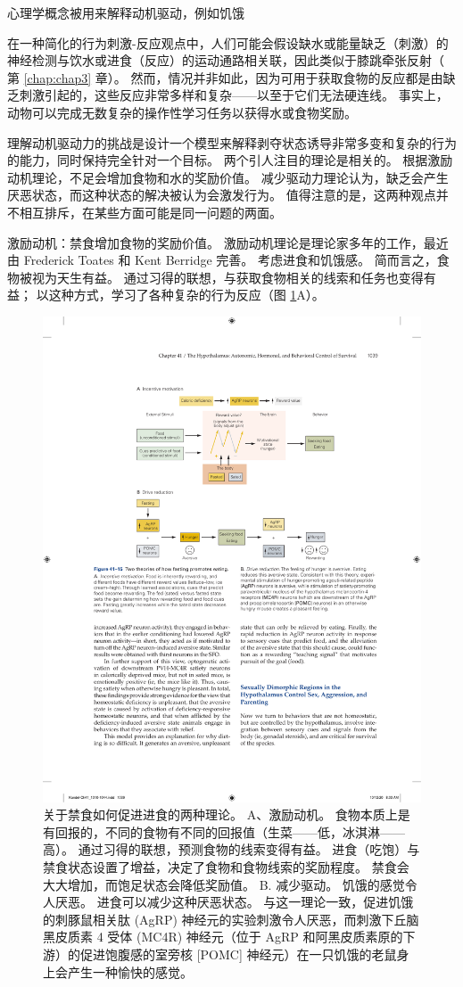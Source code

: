心理学概念被用来解释动机驱动，例如饥饿

在一种简化的行为刺激-反应观点中，人们可能会假设缺水或能量缺乏（刺激）的神经检测与饮水或进食（反应）的运动通路相关联，因此类似于膝跳牵张反射（ 第 \ref{chap:chap3} 章）。 然而，情况并非如此，因为可用于获取食物的反应都是由缺乏刺激引起的，这些反应非常多样和复杂——以至于它们无法硬连线。 事实上，动物可以完成无数复杂的操作性学习任务以获得水或食物奖励。

理解动机驱动力的挑战是设计一个模型来解释剥夺状态诱导非常多变和复杂的行为的能力，同时保持完全针对一个目标。 两个引人注目的理论是相关的。 根据激励动机理论，不足会增加食物和水的奖励价值。 减少驱动力理论认为，缺乏会产生厌恶状态，而这种状态的解决被认为会激发行为。 值得注意的是，这两种观点并不相互排斥，在某些方面可能是同一问题的两面。

激励动机：禁食增加食物的奖励价值。 激励动机理论是理论家多年的工作，最近由 Frederick Toates 和 Kent Berridge 完善。 考虑进食和饥饿感。 简而言之，食物被视为天生有益。 
通过习得的联想，与获取食物相关的线索和任务也变得有益； 以这种方式，学习了各种复杂的行为反应（图 \ref{fig:41_15}A）。

\begin{figure}[htbp]
	\centering
	\includegraphics[width=0.75\linewidth]{chap41/fig_41_15}
	\caption{关于禁食如何促进进食的两种理论。 
		A、激励动机。 食物本质上是有回报的，不同的食物有不同的回报值（生菜——低，冰淇淋——高）。 通过习得的联想，预测食物的线索变得有益。 进食（吃饱）与禁食状态设置了增益，决定了食物和食物线索的奖励程度。 禁食会大大增加，而饱足状态会降低奖励值。 B. 减少驱动。 饥饿的感觉令人厌恶。 进食可以减少这种厌恶状态。 与这一理论一致，促进饥饿的刺豚鼠相关肽 (AgRP) 神经元的实验刺激令人厌恶，而刺激下丘脑黑皮质素 4 受体 (MC4R) 神经元（位于 AgRP 和阿黑皮质素原的下游）的促进饱腹感的室旁核 [POMC] 神经元）在一只饥饿的老鼠身上会产生一种愉快的感觉。}
	\label{fig:41_15}
\end{figure}

